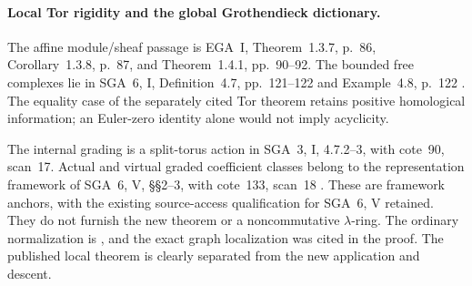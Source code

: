 \paragraph{Local Tor rigidity and the global Grothendieck dictionary.}
The affine module/sheaf passage is EGA~I,
Theorem~1.3.7, p.~86, Corollary~1.3.8, p.~87,
and Theorem~1.4.1, pp.~90--92.
The bounded free complexes lie in SGA~6, I,
Definition~4.7, pp.~121--122 and Example~4.8, p.~122
\cite{EGA,SGA6}. The equality case of the separately
cited Tor theorem retains positive homological
information; an Euler-zero identity alone would
not imply acyclicity.

The internal grading is a split-torus action in
SGA~3, I, 4.7.2--3, with cote~90, scan~17.
Actual and virtual graded coefficient classes belong
to the representation framework of SGA~6, V,
\S\S2--3, with cote~133, scan~18
\cite{SGA3,SGA6,Archive}.
These are framework anchors, with the existing
source-access qualification for SGA~6, V retained.
They do not furnish the new theorem or a
noncommutative \(\lambda\)-ring.
The ordinary normalization is
\cite[\S\S3.3--3.5]{EW}, and the exact graph
localization was cited in the proof.
The published local theorem is clearly separated
from the new application and descent.
